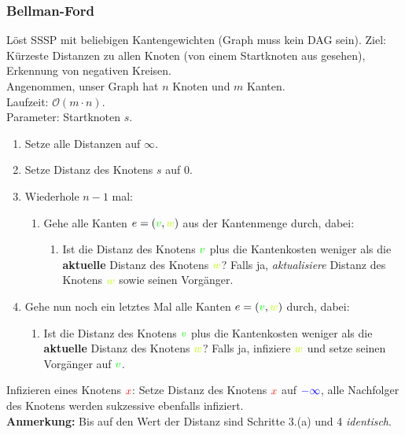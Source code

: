 \documentclass[12pt,a4paper]{article}
\begin{document}
\subsubsection{Bellman-Ford}
Löst SSSP mit beliebigen Kantengewichten (Graph muss kein DAG sein). Ziel: Kürzeste Distanzen zu allen Knoten (von einem Startknoten aus gesehen), Erkennung von negativen Kreisen.\\
Angenommen, unser Graph hat $n$ Knoten und $m$ Kanten.\\
Laufzeit: $\mathcal{O}(m\cdot n)$.\\
Parameter: Startknoten $s$.
\begin{enumerate}
\item Setze alle \colorbox{blue!17}{Distanzen} auf \color{blue}$\infty$\color{black}.
\item Setze \colorbox{blue!17}{Distanz des Knotens \color{purple}$s$} \color{black} auf \color{blue}$0$\color{black}.
\item Wiederhole \color{cyan}$n-1$ \color{black} mal: \begin{enumerate}
\item Gehe alle Kanten $e=(\color{green}v\color{black},\color{lime}w\color{black})$ aus der Kantenmenge durch, dabei:\begin{enumerate}
\item Ist die \colorbox{blue!17}{Distanz des Knotens $\color{green}v$} plus die \colorbox{orange!25}{Kantenkosten} weniger als die \textbf{aktuelle} \colorbox{blue!17}{Distanz des Knotens $\color{lime}w$}? Falls ja, \textit{aktualisiere} \colorbox{blue!17}{Distanz des Knotens $\color{lime}w$} sowie seinen Vorgänger.
\end{enumerate}
\end{enumerate}
\item Gehe nun noch ein letztes Mal alle Kanten $e=(\color{green}v\color{black},\color{lime}w\color{black})$ durch, dabei:\begin{enumerate}
\item Ist die \colorbox{blue!17}{Distanz des Knotens $\color{green}v$} plus die \colorbox{orange!25}{Kantenkosten} weniger als die \textbf{aktuelle} \colorbox{blue!17}{Distanz des Knotens $\color{lime}w$}? Falls ja, \color{red}infiziere $\color{lime}w$ \color{black}und setze seinen Vorgänger auf $\color{green}v$.
\end{enumerate}
\end{enumerate}
Infizieren eines Knotens $\color{red}x$: Setze \colorbox{blue!17}{Distanz des Knotens $\color{red}x$} auf $\color{blue}-\infty$, alle Nachfolger des Knotens werden sukzessive ebenfalls \color{red}infiziert\color{black}.\\
\textbf{Anmerkung:} Bis auf den Wert der Distanz sind Schritte 3.(a) und 4 \textit{identisch}.
\end{document}
